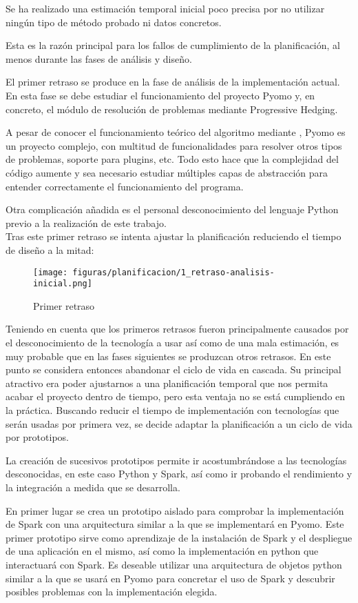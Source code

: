 Se ha realizado una estimación temporal inicial poco precisa por no utilizar ningún tipo de método probado ni datos concretos.

Esta es la razón principal para los fallos de cumplimiento de la planificación, al menos durante las fases de análisis y diseño.

El primer retraso se produce en la fase de análisis de la implementación actual. En esta fase se debe estudiar el funcionamiento del proyecto Pyomo y, en concreto, el módulo de resolución de problemas mediante Progressive Hedging. 

A pesar de conocer el funcionamiento teórico del algoritmo mediante \cite{TODO}, Pyomo es un proyecto complejo, con multitud de funcionalidades para resolver otros tipos de problemas, soporte para plugins, etc. Todo esto hace que la complejidad del código aumente y sea necesario estudiar múltiples capas de abstracción para entender correctamente el funcionamiento del programa.

Otra complicación añadida es el personal desconocimiento del lenguaje Python previo a la realización de este trabajo.\\

Tras este primer retraso se intenta ajustar la planificación reduciendo el tiempo de diseño a la mitad:

\begin{figure}[H]
    \centerline{\texttt{[image: figuras/planificacion/1\_retraso-analisis-inicial.png]}}
    \caption{Primer retraso}
\end{figure}

Teniendo en cuenta que los primeros retrasos fueron principalmente causados por el desconocimiento de la tecnología a usar así como de una mala estimación, es muy probable que en las fases siguientes se produzcan otros retrasos. En este punto se considera entonces abandonar el ciclo de vida en cascada. Su principal atractivo era poder ajustarnos a una planificación temporal que nos permita acabar el proyecto dentro de tiempo, pero esta ventaja no se está cumpliendo en la práctica. Buscando reducir el tiempo de implementación con tecnologías que serán usadas por primera vez, se decide adaptar la planificación a un ciclo de vida por prototipos. 

La creación de sucesivos prototipos permite ir acostumbrándose a las tecnologías desconocidas, en este caso Python y Spark, así como ir probando el rendimiento y la integración a medida que se desarrolla.

En primer lugar se crea un prototipo aislado para comprobar la implementación de Spark con una arquitectura similar a la que se implementará en Pyomo. Este primer prototipo sirve como aprendizaje de la instalación de Spark y el despliegue de una aplicación en el mismo, así como la implementación en python que interactuará con Spark. Es deseable utilizar una arquitectura de objetos python similar a la que se usará en Pyomo para concretar el uso de Spark y descubrir posibles problemas con la implementación elegida.


